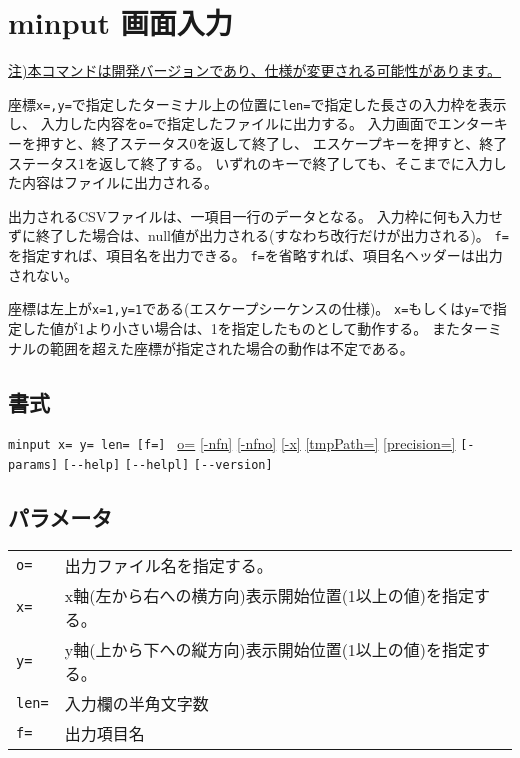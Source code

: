 
%

\section{minput 画面入力\label{sect:minput}}
\underline{注)本コマンドは開発バージョンであり、仕様が変更される可能性があります。}

座標\verb|x=,y=|で指定したターミナル上の位置に\verb|len=|で指定した長さの入力枠を表示し、
入力した内容を\verb|o=|で指定したファイルに出力する。
入力画面でエンターキーを押すと、終了ステータス0を返して終了し、
エスケープキーを押すと、終了ステータス1を返して終了する。
いずれのキーで終了しても、そこまでに入力した内容はファイルに出力される。

出力されるCSVファイルは、一項目一行のデータとなる。
入力枠に何も入力せずに終了した場合は、null値が出力される(すなわち改行だけが出力される)。
\verb|f=|を指定すれば、項目名を出力できる。
\verb|f=|を省略すれば、項目名ヘッダーは出力されない。

座標は左上が\verb|x=1,y=1|である(エスケープシーケンスの仕様)。
\verb|x=|もしくは\verb|y=|で指定した値が1より小さい場合は、1を指定したものとして動作する。
またターミナルの範囲を超えた座標が指定された場合の動作は不定である。


\subsection*{書式}
\verb/minput x= y= len= [f=] /
\hyperref[sect:option_o]{o=}
\hyperref[sect:option_nfn]{[-nfn]} 
\hyperref[sect:option_nfno]{[-nfno]}  
\hyperref[sect:option_x]{[-x]}
\hyperref[sect:option_option_tmppath]{[tmpPath=]}
\hyperref[sect:option_precision]{[precision=]}
\verb|[-params]|
\verb|[--help]|
\verb|[--helpl]|
\verb|[--version]|\\

\subsection*{パラメータ}
\begin{table}[htbp]
{\small
\begin{tabular}{ll}
\verb|o=|   & 出力ファイル名を指定する。\\
\verb|x=|   & x軸(左から右への横方向)表示開始位置(1以上の値)を指定する。\\
\verb|y=|   & y軸(上から下への縦方向)表示開始位置(1以上の値)を指定する。\\
\verb|len=| & 入力欄の半角文字数 \\
\verb|f=|   & 出力項目名\\
\end{tabular} 
}
\end{table} 

